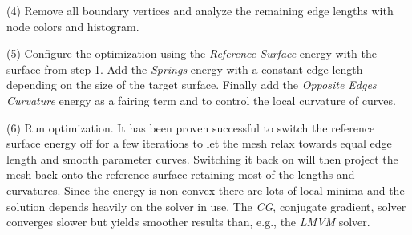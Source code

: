 \documentclass[Thesis.tex]{subfiles}
\begin{document}
\begin{compactenum}[(1)]
\item[(4)] Remove all boundary vertices and analyze the remaining edge lengths with node colors and histogram.

\begin{center}
\begin{minipage}{\linewidth}
            \centering
\end{minipage}
\end{center}   

\item[(5)] Configure the optimization using the \emph{Reference Surface} energy with the surface from step 1. Add the \emph{Springs} energy with a constant edge length depending on the size of the target surface. Finally add the \emph{Opposite Edges Curvature} energy as a fairing term and to control the local curvature of curves.

\begin{center}
\begin{minipage}{\linewidth}
            \centering
\end{minipage}
\end{center}   

\item[(6)] Run optimization. It has been proven successful to switch the reference surface energy off for a few iterations to let the mesh relax towards equal edge length and smooth parameter curves. Switching it back on will then project the mesh back onto the reference surface retaining most of the lengths and curvatures. Since the energy is non-convex there are lots of local minima and the solution depends heavily on the solver in use. The \emph{CG}, conjugate gradient, solver converges slower but yields smoother results than, e.g., the \emph{LMVM} solver.

\end{compactenum}

\subfilebibliography
\end{document}
